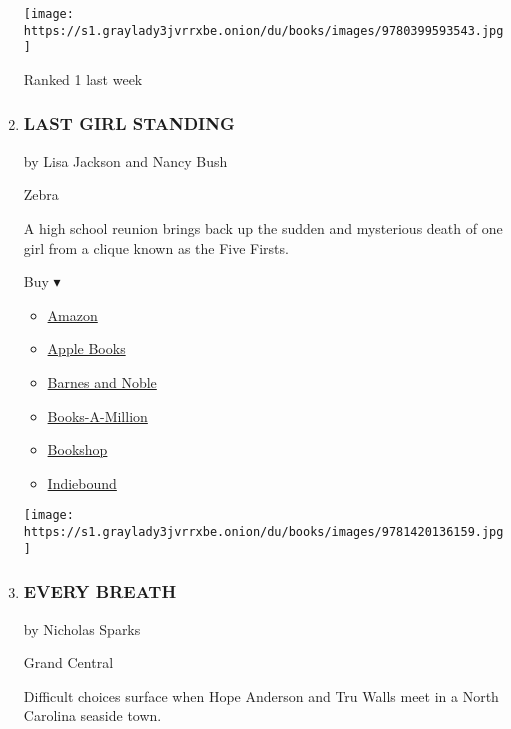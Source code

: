 \begin{enumerate}
  \texttt{[image: https://s1.graylady3jvrrxbe.onion/du/books/images/9780399593543.jpg]}

  Ranked 1 last week
\item
  \hypertarget{last-girl-standing}{%
  \subsubsection{LAST GIRL STANDING}\label{last-girl-standing}}

  by Lisa Jackson and Nancy Bush

  Zebra

  A high school reunion brings back up the sudden and mysterious death
  of one girl from a clique known as the Five Firsts.

  Buy ▾

  \begin{itemize}
  \tightlist
  \item
    \href{https://www.amazon.com/dp/1420136151?tag=NYTBSREV-20\&tag=NYTBS-20}{Amazon}
  \item
    \href{https://du-gae-books-dot-nyt-du-prd.appspot.com/buy?title=LAST+GIRL+STANDING\&author=Lisa+Jackson+and+Nancy+Bush}{Apple
    Books}
  \item
    \href{https://www.anrdoezrs.net/click-7990613-11819508?url=https\%3A\%2F\%2Fwww.barnesandnoble.com\%2Fw\%2F\%3Fean\%3D9781420136159}{Barnes
    and Noble}
  \item
    \href{https://www.anrdoezrs.net/click-7990613-35140?url=https\%3A\%2F\%2Fwww.booksamillion.com\%2Fp\%2FLAST\%2BGIRL\%2BSTANDING\%2FLisa\%2BJackson\%2Band\%2BNancy\%2BBush\%2F9781420136159}{Books-A-Million}
  \item
    \href{https://bookshop.org/a/3546/9781420136159}{Bookshop}
  \item
    \href{https://www.indiebound.org/book/9781420136159?aff=NYT}{Indiebound}
  \end{itemize}

  \texttt{[image: https://s1.graylady3jvrrxbe.onion/du/books/images/9781420136159.jpg]}
\item
  \hypertarget{every-breath}{%
  \subsubsection{EVERY BREATH}\label{every-breath}}

  by Nicholas Sparks

  Grand Central

  Difficult choices surface when Hope Anderson and Tru Walls meet in a
  North Carolina seaside town.


\end{enumerate}
